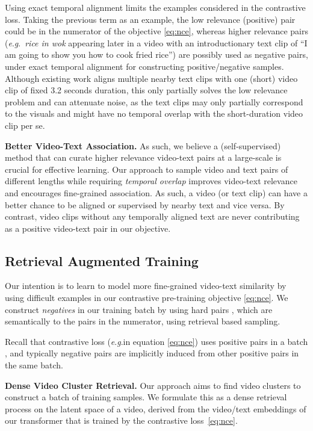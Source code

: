 \documentclass[11pt]{article}
\newcommand{\eg}{\textit{e}.\textit{g}.}
\begin{document}
Using exact temporal alignment limits the examples considered in the contrastive loss.
Taking the previous  term as an example, the low relevance (positive) pair could be in the numerator of the objective \eqref{eq:nce}, whereas higher relevance pairs (\eg~\textit{rice in wok} appearing later in a video with an introductionary text clip of ``{I am going to show you how to cook fried rice}'') are possibly used as negative pairs, under exact temporal alignment for constructing positive/negative samples.
Although existing work \cite{miech2020end} aligns multiple nearby text clips with one (short) video clip of fixed 3.2 seconds duration, this only partially solves the low relevance problem and can attenuate noise, as the text clips may only partially correspond to the visuals and might have no temporal overlap with the short-duration video clip per se.

\noindent \textbf{Better Video-Text Association.}
As such, we believe a (self-supervised) method that can curate higher relevance video-text pairs at a large-scale is crucial for effective learning. 
Our approach to sample video and text pairs  of different lengths while requiring \textit{temporal overlap} improves video-text relevance and encourages fine-grained association.
As such, a video (or text clip) can have a better chance to be aligned or supervised by nearby text and vice versa. By contrast, video clips without any temporally aligned text are never contributing as a positive video-text pair in our objective. 





\subsection{Retrieval Augmented Training}
\label{sec:retri}
Our intention is to learn to model more fine-grained video-text similarity by using difficult examples in our contrastive pre-training objective \eqref{eq:nce}.
We construct \textit{negatives} in our training batch by using hard pairs  , which are semantically to the pairs in the numerator, using retrieval based sampling.



Recall that contrastive loss (\eg in equation \eqref{eq:nce}) uses positive pairs in a batch , and typically negative pairs are implicitly induced from other positive pairs in the same batch.



\noindent \textbf{Dense Video Cluster Retrieval.}
Our approach aims to find video clusters to construct a batch of training samples.
We formulate this as a dense retrieval process on the latent space of a video,  derived from the video/text embeddings of our transformer that is trained by the contrastive loss~\eqref{eq:nce}.
\end{document}
